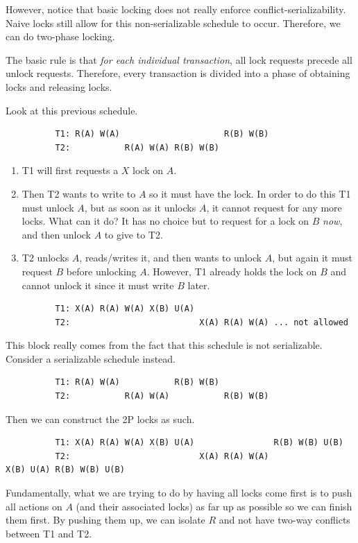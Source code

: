 \documentclass{article}
\begin{document}
      However, notice that basic locking does not really enforce conflict-serializability. Naive locks still allow for this non-serializable schedule to occur. Therefore, we can do two-phase locking. 

      \begin{definition}
        The basic rule is that \textit{for each individual transaction}, all lock requests precede all unlock requests. Therefore, every transaction is divided into a phase of obtaining locks and releasing locks.   
      \end{definition}

      \begin{example}[2PL]
        Look at this previous schedule. 
        \begin{lstlisting}
          T1: R(A) W(A)                     R(B) W(B)
          T2:           R(A) W(A) R(B) W(B) 
        \end{lstlisting}
        \begin{enumerate}
          \item T1 will first requests a $X$ lock on $A$. 
          \item Then T2 wants to write to $A$ so it must have the lock. In order to do this T1 must unlock $A$, but as soon as it unlocks $A$, it cannot request for any more locks. What can it do? It has no choice but to request for a lock on $B$ \textit{now}, and then unlock $A$ to give to T2. 
          \item T2 unlocks $A$, reads/writes it, and then wants to unlock $A$, but again it must request $B$ before unlocking $A$. However, T1 already holds the lock on $B$ and cannot unlock it since it must write $B$ later. 
        \end{enumerate}
        \begin{lstlisting} 
          T1: X(A) R(A) W(A) X(B) U(A) 
          T2:                          X(A) R(A) W(A) ... not allowed
        \end{lstlisting}
        This block really comes from the fact that this schedule is not serializable. Consider a serializable schedule instead. 
        \begin{lstlisting} 
          T1: R(A) W(A)           R(B) W(B)
          T2:           R(A) W(A)           R(B) W(B) 
        \end{lstlisting} 
        Then we can construct the 2P locks as such. 
        \begin{lstlisting}
          T1: X(A) R(A) W(A) X(B) U(A)                R(B) W(B) U(B) 
          T2:                          X(A) R(A) W(A)                X(B) U(A) R(B) W(B) U(B) 
        \end{lstlisting}
        Fundamentally, what we are trying to do by having all locks come first is to push all actions on $A$ (and their associated locks) as far up as possible so we can finish them first. By pushing them up, we can isolate $R$ and not have two-way conflicts between T1 and T2. 
      \end{example}
\end{document}
